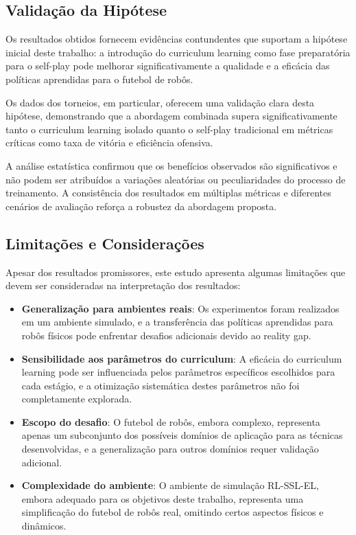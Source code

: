 \subsection{Validação da Hipótese}

Os resultados obtidos fornecem evidências contundentes que suportam a hipótese inicial deste trabalho: a introdução do curriculum learning como fase preparatória para o self-play pode melhorar significativamente a qualidade e a eficácia das políticas aprendidas para o futebol de robôs.

Os dados dos torneios, em particular, oferecem uma validação clara desta hipótese, demonstrando que a abordagem combinada supera significativamente tanto o curriculum learning isolado quanto o self-play tradicional em métricas críticas como taxa de vitória e eficiência ofensiva.

A análise estatística confirmou que os benefícios observados são significativos e não podem ser atribuídos a variações aleatórias ou peculiaridades do processo de treinamento. A consistência dos resultados em múltiplas métricas e diferentes cenários de avaliação reforça a robustez da abordagem proposta.

\subsection{Limitações e Considerações}

Apesar dos resultados promissores, este estudo apresenta algumas limitações que devem ser consideradas na interpretação dos resultados:

\begin{itemize}
    \item \textbf{Generalização para ambientes reais}: Os experimentos foram realizados em um ambiente simulado, e a transferência das políticas aprendidas para robôs físicos pode enfrentar desafios adicionais devido ao reality gap.
    
    \item \textbf{Sensibilidade aos parâmetros do curriculum}: A eficácia do curriculum learning pode ser influenciada pelos parâmetros específicos escolhidos para cada estágio, e a otimização sistemática destes parâmetros não foi completamente explorada.
    
    \item \textbf{Escopo do desafio}: O futebol de robôs, embora complexo, representa apenas um subconjunto dos possíveis domínios de aplicação para as técnicas desenvolvidas, e a generalização para outros domínios requer validação adicional.
    
    \item \textbf{Complexidade do ambiente}: O ambiente de simulação RL-SSL-EL, embora adequado para os objetivos deste trabalho, representa uma simplificação do futebol de robôs real, omitindo certos aspectos físicos e dinâmicos.
\end{itemize}

